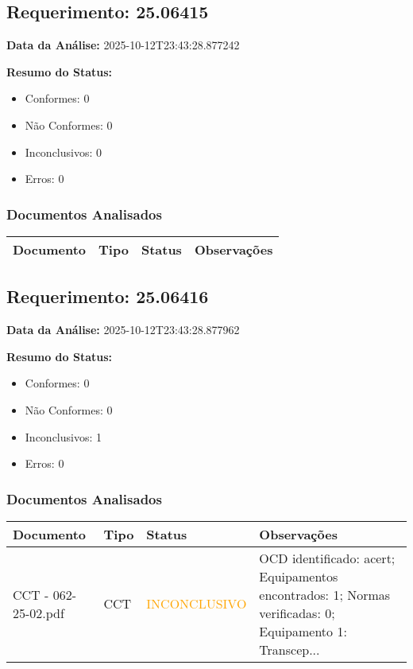 \documentclass[12pt,a4paper]{article}
\begin{document}
\subsection{Requerimento: 25.06415}

\textbf{Data da Análise:} 2025-10-12T23:43:28.877242

\textbf{Resumo do Status:}
\begin{itemize}
    \item Conformes: 0
    \item Não Conformes: 0
    \item Inconclusivos: 0
    \item Erros: 0
\end{itemize}

\subsubsection{Documentos Analisados}

\begin{longtable}{|p{4cm}|p{2cm}|p{2cm}|p{6cm}|}
\hline
\textbf{Documento} & \textbf{Tipo} & \textbf{Status} & \textbf{Observações} \\
\hline
\endhead
\end{longtable}


\subsection{Requerimento: 25.06416}

\textbf{Data da Análise:} 2025-10-12T23:43:28.877962

\textbf{Resumo do Status:}
\begin{itemize}
    \item Conformes: 0
    \item Não Conformes: 0
    \item Inconclusivos: 1
    \item Erros: 0
\end{itemize}

\subsubsection{Documentos Analisados}

\begin{longtable}{|p{4cm}|p{2cm}|p{2cm}|p{6cm}|}
\hline
\textbf{Documento} & \textbf{Tipo} & \textbf{Status} & \textbf{Observações} \\
\hline
\endhead
CCT - 062-25-02.pdf & CCT & \textcolor{orange}{INCONCLUSIVO} & OCD identificado: acert; Equipamentos encontrados: 1; Normas verificadas: 0; Equipamento 1: Transcep... \\
\hline
\end{longtable}
\end{document}
